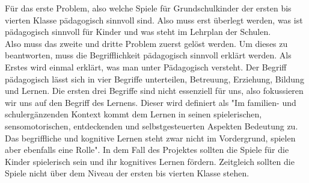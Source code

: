 Für das erste Problem, also welche Spiele für Grundschulkinder der ersten bis vierten Klasse pädagogisch sinnvoll sind. Also muss erst überlegt werden, was ist pädagogisch sinnvoll für Kinder und was steht im Lehrplan der Schulen.\\
Also muss das zweite und dritte Problem zuerst gelöst werden. Um dieses zu beantworten, muss die Begrifflichkeit pädagogisch sinnvoll erklärt werden. Als Erstes wird einmal erklärt, was man unter Pädagogisch versteht. Der Begriff pädagogisch lässt sich in vier Begriffe unterteilen, Betreuung, Erziehung, Bildung und Lernen. Die ersten drei Begriffe sind nicht essenziell für uns, also fokussieren wir uns auf den Begriff des Lernens. Dieser wird definiert als "Im familien- und schulergänzenden Kontext kommt dem Lernen in seinen spielerischen, sensomotorischen, entdeckenden und selbstgesteuerten Aspekten Bedeutung zu. Das begriffliche und kognitive Lernen steht zwar nicht im Vordergrund, spielen aber ebenfalls eine Rolle". In dem Fall des Projektes sollten die Spiele für die Kinder spielerisch sein und ihr kognitives Lernen fördern. Zeitgleich sollten die Spiele nicht über dem Niveau der ersten bis vierten Klasse stehen.\\

